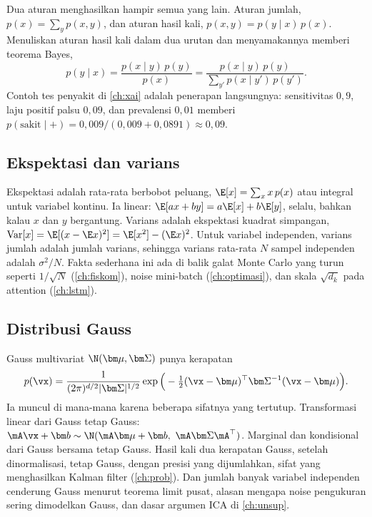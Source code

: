 Dua aturan menghasilkan hampir semua yang lain. Aturan jumlah, $p(x)=\sum_yp(x,y)$, dan aturan hasil kali,
$p(x,y)=p(y\mid x)\,p(x)$. Menuliskan aturan hasil kali dalam dua urutan dan menyamakannya memberi teorema Bayes,
\begin{equation}
p(y\mid x)=\frac{p(x\mid y)\,p(y)}{p(x)}=\frac{p(x\mid y)\,p(y)}{\sum_{y'}p(x\mid y')\,p(y')}.
\end{equation}
Contoh tes penyakit di \cref{ch:xai} adalah penerapan langsungnya: sensitivitas $0{,}9$, laju positif palsu $0{,}09$, dan
prevalensi $0{,}01$ memberi $p(\text{sakit}\mid+)=0{,}009/(0{,}009+0{,}0891)\approx0{,}09$.

\subsection{Ekspektasi dan varians}

Ekspektasi adalah rata-rata berbobot peluang, $\E[x]=\sum_xx\,p(x)$ atau integral untuk variabel kontinu. Ia linear:
$\E[ax+by]=a\E[x]+b\E[y]$, selalu, bahkan kalau $x$ dan $y$ bergantung. Varians adalah ekspektasi kuadrat simpangan,
$\mathrm{Var}[x]=\E[(x-\E x)^2]=\E[x^2]-(\E x)^2$. Untuk variabel independen, varians jumlah adalah jumlah varians, sehingga
varians rata-rata $N$ sampel independen adalah $\sigma^2/N$. Fakta sederhana ini ada di balik galat Monte Carlo yang turun
seperti $1/\sqrt N$ (\cref{ch:fiskom}), noise mini-batch (\cref{ch:optimasi}), dan skala $\sqrt{d_k}$ pada attention
(\cref{ch:lstm}).

\subsection{Distribusi Gauss}

Gauss multivariat $\N(\bm\mu,\bm\Sigma)$ punya kerapatan
\begin{equation}
p(\vx)=\frac1{(2\pi)^{d/2}|\bm\Sigma|^{1/2}}\exp\Big(-\tfrac12(\vx-\bm\mu)^\top\bm\Sigma^{-1}(\vx-\bm\mu)\Big).
\end{equation}
Ia muncul di mana-mana karena beberapa sifatnya yang tertutup. Transformasi linear dari Gauss tetap Gauss:
$\mA\vx+\bm b\sim\N(\mA\bm\mu+\bm b,\ \mA\bm\Sigma\mA^\top)$. Marginal dan kondisional dari Gauss bersama tetap Gauss. Hasil kali dua
kerapatan Gauss, setelah dinormalisasi, tetap Gauss, dengan presisi yang dijumlahkan, sifat yang menghasilkan Kalman filter
(\cref{ch:prob}). Dan jumlah banyak variabel independen cenderung Gauss menurut teorema limit pusat, alasan mengapa noise
pengukuran sering dimodelkan Gauss, dan dasar argumen ICA di \cref{ch:unsup}.

